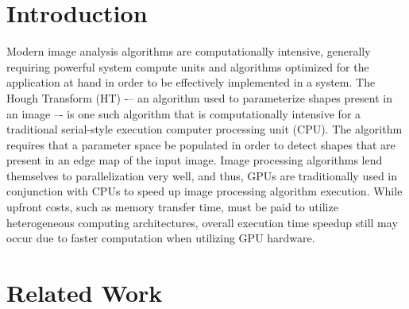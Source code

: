 \documentclass[conference]{IEEEtran}
\begin{document}






\section{Introduction}
Modern image analysis algorithms are computationally intensive, generally requiring powerful system compute units and algorithms optimized for the application at hand in order to be effectively implemented in a system. 
The Hough Transform (HT)\cite{BALLARD1981111} -– an algorithm used to parameterize shapes present in an image –- is one such algorithm that is computationally intensive for a traditional serial-style execution computer processing unit (CPU).
The algorithm requires that a parameter space be populated in order to detect shapes that are present in an edge map of the input image.
Image processing algorithms lend themselves to parallelization very well, and thus, GPUs are traditionally used in conjunction with CPUs to speed up image processing algorithm execution.
While upfront costs, such as memory transfer time, must be paid to utilize heterogeneous computing architectures, overall execution time speedup still may occur due to faster computation when utilizing GPU hardware.




\section{Related Work}
\end{document}
